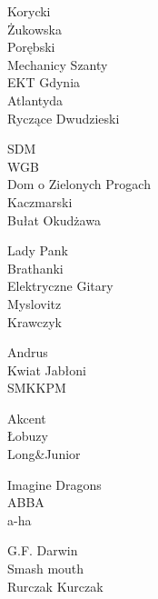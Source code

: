 {Korycki\\ Żukowska\\ Porębski\\ Mechanicy Szanty\\ EKT Gdynia\\ Atlantyda\\ Ryczące Dwudzieski\\}


{SDM\\ WGB\\ Dom o Zielonych Progach\\ Kaczmarski\\ Bułat Okudżawa\\}


{Lady Pank\\ Brathanki\\ Elektryczne Gitary\\ Myslovitz\\ Krawczyk\\}


{Andrus\\ Kwiat Jabłoni\\ SMKKPM\\}


{Akcent\\ Łobuzy\\ Long\&Junior\\}


{Imagine Dragons\\ ABBA\\ a-ha\\}


{G.F. Darwin\\ Smash mouth\\ Rurczak Kurczak\\}


